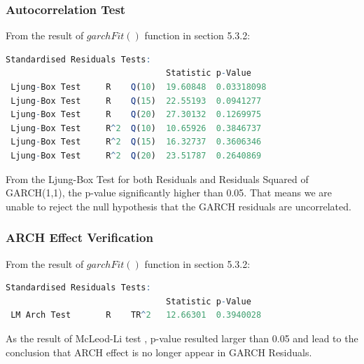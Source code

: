 \subsubsection{Autocorrelation Test}
From the result of $garchFit()$ function in section 5.3.2:
\begin{lstlisting}[language=R]
Standardised Residuals Tests:
                                Statistic p-Value     
 Ljung-Box Test     R    Q(10)  19.60848  0.03318098  
 Ljung-Box Test     R    Q(15)  22.55193  0.0941277   
 Ljung-Box Test     R    Q(20)  27.30132  0.1269975   
 Ljung-Box Test     R^2  Q(10)  10.65926  0.3846737   
 Ljung-Box Test     R^2  Q(15)  16.32737  0.3606346   
 Ljung-Box Test     R^2  Q(20)  23.51787  0.2640869     
 \end{lstlisting}
From the Ljung-Box Test \cite{box1970distribution,ljung1978measure} for both Residuals and Residuals Squared of GARCH(1,1), the p-value significantly higher than 0.05. That means we are unable to reject the null hypothesis that the GARCH residuals are uncorrelated.

\subsubsection{ARCH Effect Verification}
From the result of $garchFit()$ function in section 5.3.2:
\begin{lstlisting}[language=R]
Standardised Residuals Tests:
                                Statistic p-Value      
 LM Arch Test       R    TR^2   12.66301  0.3940028  
 \end{lstlisting}
As the result of McLeod-Li test \cite{mcleod1983diagnostic}, p-value resulted larger than 0.05 and lead to the conclusion that ARCH effect is no longer appear in GARCH Residuals. 